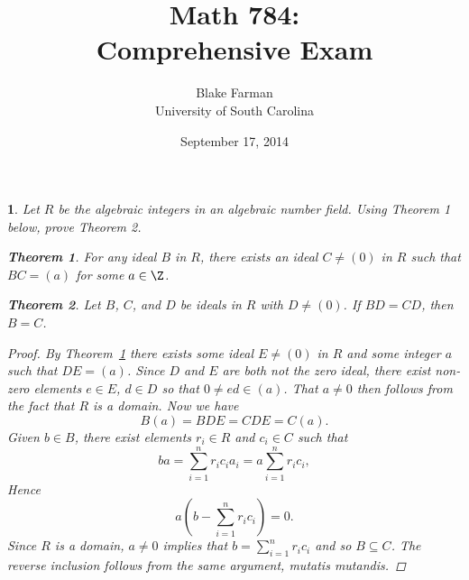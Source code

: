 \documentclass[10pt]{amsart}
\author{Blake Farman\\University of South Carolina}
\title{Math 784:\\Comprehensive Exam}
\date{September 17, 2014}
\begin{document}
\maketitle

\providecommand{\Tr}[2]{\operatorname{Tr}_{#1}\left(#2\right)}
\providecommand{\p}{\mathfrak{p}}
\providecommand{\m}{\mathfrak{m}}
\providecommand{\Deck}[1]{\operatorname{Deck}\left(#1\right)}
\newtheorem{thm}{}
\newtheorem{lem}{Lemma}
\newtheorem{prop}{Proposition}
\theoremstyle{definition}
\newtheorem{defn}{Definition}[thm]

\newcommand{\A}{\mathbb{A}}

\begin{thm}\label{Ex1}
	Let $R$ be the algebraic integers in an algebraic number field.
	Using Theorem 1 below, prove Theorem 2.
	
	\newtheorem{tthm}{Theorem}
	\begin{tthm}\label{T.1.1}
		For any ideal $B$ in $R$, there exists an ideal $C \neq (0)$ in $R$ such that $BC = (a)$ for some $a \in \Z$.
	\end{tthm}

	\begin{tthm}
		Let $B$, $C$, and $D$ be ideals in $R$ with $D \neq (0)$.
		If $BD = CD$, then $B = C$.
	\end{tthm}

	\begin{proof}
		By Theorem~\ref{T.1.1} there exists some ideal $E \neq (0)$ in $R$ and some integer $a$ such that $DE = (a)$.
		Since $D$ and $E$ are both not the zero ideal, there exist non-zero elements $e \in E$, $d \in D$ so that $0 \neq ed \in (a)$.
		That $a \neq 0$ then follows from the fact that $R$ is a domain.
		Now we have
		$$B(a) = BDE = CDE = C(a).$$
		Given $b \in B$, there exist elements $r_i \in R$ and $c_i \in C$ such that
		$$ba = \sum_{i=1}^n r_ic_ia_i = a\sum_{i=1}^n r_ic_i,$$
		Hence
		$$a(b - \sum_{i=1}^n r_ic_i) = 0.$$
		Since $R$ is a domain, $a \neq 0$ implies that $b = \sum_{i=1}^n r_ic_i$ and so $B \subseteq C$.
		The reverse inclusion follows from the same argument, mutatis mutandis.
	\end{proof}
\end{thm}
\end{document}
